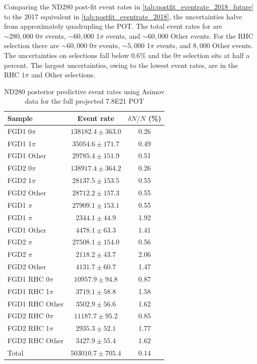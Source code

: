 Comparing the ND280 post-fit event rates in \autoref{tab:postfit_eventrate_2018_future} to the 2017 equivalent in \autoref{tab:postfit_eventrate_2018}, the uncertainties halve from approximately quadrupling the POT. The total event rates for \numu are $\sim 280,000$ 0$\pi$  events, $\sim 60,000$ 1$\pi$ events, and $\sim 60,000$ Other events. For the RHC selection there are $\sim 60,000$ 0$\pi$ events, $\sim 5,000$ 1$\pi$ events, and $8,000$ Other events. The uncertainties on \numu selections fall below 0.6\% and the 0$\pi$ \numubar selection sits at half a percent. The largest uncertainties, owing to the lowest event rates, are in the RHC $1\pi$ and Other selections.
\begin{table}[h]
	\centering
	\begin{tabular}{ l | c c }
		\hline
		\hline
		Sample 			& Event rate & $\delta N/N$ (\%) \\
		\hline
		FGD1 0$\pi$ 	& $138182.4\pm363.0$ & 0.26 \\ 
		FGD1 1$\pi$ 	& $35054.6\pm171.7$ & 0.49 \\ 
		FGD1 Other 		& $29785.4\pm151.9$ & 0.51\\ 
		\hline
		FGD2 0$\pi$ 	& $138917.4\pm364.2$ & 0.26\\ 
		FGD2 1$\pi$ 	& $28137.5\pm153.5$ & 0.55 \\ 
		FGD2 Other 		& $28712.2\pm157.3$ & 0.55 \\ 
		\hline
		FGD1 \numubar 0$\pi$ 	& $27909.1\pm153.1$ & 0.55	\\ 
		FGD1 \numubar 1$\pi$ 	& $2344.1\pm44.9$ & 1.92	\\ 
		FGD1 \numubar Other 	& $4478.1\pm63.3$ & 1.41	\\ 
		\hline
		FGD2 \numubar 0$\pi$ 	& $27508.1 \pm154.0$ & 0.56	\\ 
		FGD2 \numubar 1$\pi$ 	& $2118.2\pm43.7$ & 2.06	\\ 
		FGD2 \numubar Other 	& $4131.7\pm60.7$ & 1.47	\\ 
		\hline
		FGD1 \numu RHC 0$\pi$ 	& $10957.9\pm94.8$ & 0.87	\\ 
		FGD1 \numu RHC 1$\pi$ 	& $3719.1\pm58.8$ & 1.58	\\ 
		FGD1 \numu RHC Other 	& $3502.9\pm56.6$ & 1.62	\\ 
		\hline
		FGD2 \numu RHC 0$\pi$ 	& $11187.7\pm95.2$	& 0.85 \\ 
		FGD2 \numu RHC 1$\pi$ 	& $2935.3\pm52.1$ & 1.77	\\ 
		FGD2 \numu RHC Other 	& $3427.9\pm55.4$ & 1.62	\\ 
		\hline
		Total 				& $503010.7\pm705.4$ & 0.14 \\
		\hline
		\hline
	\end{tabular}
	\caption{ND280 posterior predictive event rates using Asimov data for the full projected 7.8E21 POT}
	\label{tab:postfit_eventrate_2018_future}
\end{table}


